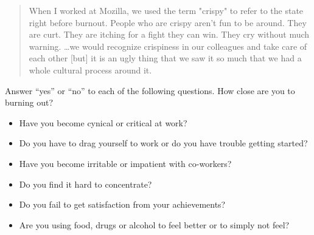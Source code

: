 \begin{quote}
  When I worked at Mozilla,
  we used the term "crispy" to refer to the state right before burnout.
  People who are crispy aren't fun to be around.
  They are curt.
  They are itching for a fight they can win.
  They cry without much warning.
  {\ldots}we would recognize crispiness in our colleagues and take care of each other
  [but] it is an ugly thing that we saw it so much that we had a whole cultural process around it.
\end{quote}

\noindent
Answer ``yes'' or ``no'' to each of the following questions.
How close are you to burning out?

\begin{itemize}
\item Have you become cynical or critical at work?
\item Do you have to drag yourself to work or do you have trouble getting started?
\item Have you become irritable or impatient with co-workers?
\item Do you find it hard to concentrate?
\item Do you fail to get satisfaction from your achievements?
\item Are you using food, drugs or alcohol to feel better or to simply not feel?
\end{itemize}
